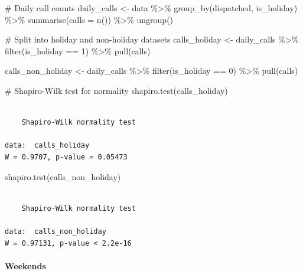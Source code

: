 \documentclass[
  letterpaper,
  DIV=11,
  numbers=noendperiod]{scrartcl}
\let\oldparagraph\paragraph
\renewcommand{\paragraph}[1]{\oldparagraph{#1}\mbox{}}
\newenvironment{Shaded}{\begin{snugshade}}{\end{snugshade}}
\newcommand{\AttributeTok}[1]{\textcolor[rgb]{0.40,0.45,0.13}{#1}}
\newcommand{\CommentTok}[1]{\textcolor[rgb]{0.37,0.37,0.37}{#1}}
\newcommand{\DecValTok}[1]{\textcolor[rgb]{0.68,0.00,0.00}{#1}}
\newcommand{\FunctionTok}[1]{\textcolor[rgb]{0.28,0.35,0.67}{#1}}
\newcommand{\NormalTok}[1]{\textcolor[rgb]{0.00,0.23,0.31}{#1}}
\newcommand{\OtherTok}[1]{\textcolor[rgb]{0.00,0.23,0.31}{#1}}
\newcommand{\SpecialCharTok}[1]{\textcolor[rgb]{0.37,0.37,0.37}{#1}}
\begin{document}
\begin{Shaded}
\begin{Highlighting}[]
\CommentTok{\# Daily call counts}
\NormalTok{daily\_calls }\OtherTok{\textless{}{-}}\NormalTok{ data }\SpecialCharTok{\%\textgreater{}\%}
  \FunctionTok{group\_by}\NormalTok{(dispatched, is\_holiday) }\SpecialCharTok{\%\textgreater{}\%}
  \FunctionTok{summarise}\NormalTok{(}\AttributeTok{calls =} \FunctionTok{n}\NormalTok{()) }\SpecialCharTok{\%\textgreater{}\%}
  \FunctionTok{ungroup}\NormalTok{()}

\CommentTok{\# Split into holiday and non{-}holiday datasets}
\NormalTok{calls\_holiday }\OtherTok{\textless{}{-}}\NormalTok{ daily\_calls }\SpecialCharTok{\%\textgreater{}\%}
  \FunctionTok{filter}\NormalTok{(is\_holiday }\SpecialCharTok{==} \DecValTok{1}\NormalTok{) }\SpecialCharTok{\%\textgreater{}\%}
  \FunctionTok{pull}\NormalTok{(calls)}

\NormalTok{calls\_non\_holiday }\OtherTok{\textless{}{-}}\NormalTok{ daily\_calls }\SpecialCharTok{\%\textgreater{}\%}
  \FunctionTok{filter}\NormalTok{(is\_holiday }\SpecialCharTok{==} \DecValTok{0}\NormalTok{) }\SpecialCharTok{\%\textgreater{}\%}
  \FunctionTok{pull}\NormalTok{(calls)}

\CommentTok{\# Shapiro{-}Wilk test for normality}
\FunctionTok{shapiro.test}\NormalTok{(calls\_holiday)}
\end{Highlighting}
\end{Shaded}

\begin{verbatim}

    Shapiro-Wilk normality test

data:  calls_holiday
W = 0.9707, p-value = 0.05473
\end{verbatim}

\begin{Shaded}
\begin{Highlighting}[]
\FunctionTok{shapiro.test}\NormalTok{(calls\_non\_holiday)}
\end{Highlighting}
\end{Shaded}

\begin{verbatim}

    Shapiro-Wilk normality test

data:  calls_non_holiday
W = 0.97131, p-value < 2.2e-16
\end{verbatim}

\hypertarget{weekends}{%
\paragraph{Weekends}\label{weekends}}
\end{document}
